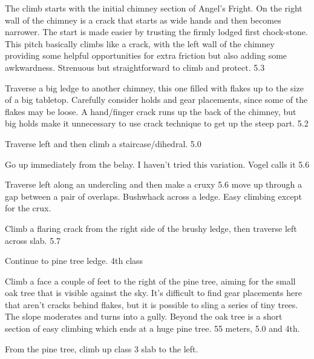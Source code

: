\documentclass{tahquitz}
\begin{document}
 The climb starts with the initial chimney section of Angel's Fright.
On the right wall of the chimney is a crack that
starts as wide hands and then becomes narrower.  The start is made
easier by trusting the firmly lodged first chock-stone.  This pitch
basically climbs like a crack, with the left wall of the chimney
providing some helpful opportunities for extra friction but also
adding some awkwardness.  Strenuous but straightforward to climb and
protect.
5.3

 Traverse a big ledge to another chimney, this one filled with
flakes up to the size of a big tabletop. Carefully consider holds and
gear placements, since some of the flakes may be loose. A hand/finger crack
runs up the back of the chimney, but big holds make it unnecessary to use crack
technique to get up the steep part. 5.2

 Traverse left and then climb a staircase/dihedral. 5.0

 Go up immediately from the belay. I haven't tried this
variation. Vogel calls it 5.6

 Traverse left along an undercling and then make a cruxy 5.6 move
up through a gap between a pair of overlaps. Bushwhack across a
ledge. Easy climbing except for the crux.

 Climb a flaring crack from the right side of the brushy ledge,
then traverse left across slab. 5.7

 Continue to pine tree ledge. 4th class

 Climb a face a couple of feet to the right of the pine tree,
aiming for the small oak tree that is visible against the sky. It's
difficult to find gear placements here that aren't cracks behind
flakes, but it is possible to sling a series of tiny trees. The slope
moderates and turns into a gully. Beyond the oak tree is a short
section of easy climbing which ends at a huge pine tree. 55 meters,
5.0 and 4th.

From the pine tree, climb up class 3 slab to the left.

\somespace

\upfriction



\end{document}
